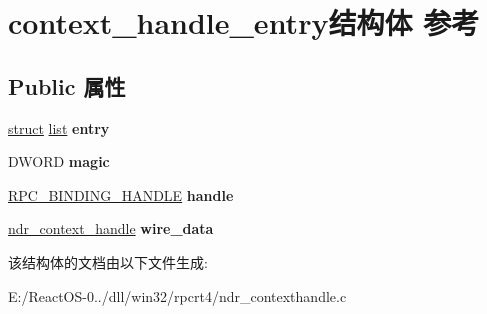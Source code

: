 \hypertarget{structcontext__handle__entry}{}\section{context\+\_\+handle\+\_\+entry结构体 参考}
\label{structcontext__handle__entry}
\subsection*{Public 属性}
\begin{DoxyCompactItemize}
\item 
\mbox{\label{structcontext__handle__entry_ac02e7e937f20ed9eef6688699f7652d3}} 
\hyperlink{interfacestruct}{struct} \hyperlink{classlist}{list} {\bfseries entry}
\item 
\mbox{\label{structcontext__handle__entry_ab9eb679bff4ba87871f0865f588b9299}} 
D\+W\+O\+RD {\bfseries magic}
\item 
\mbox{\label{structcontext__handle__entry_ada9b25fb96f83b4add779449413f6be7}} 
\hyperlink{interfacevoid}{R\+P\+C\+\_\+\+B\+I\+N\+D\+I\+N\+G\+\_\+\+H\+A\+N\+D\+LE} {\bfseries handle}
\item 
\mbox{\label{structcontext__handle__entry_a2e11f396238ef75e82d124626309e0c5}} 
\hyperlink{structndr__context__handle}{ndr\+\_\+context\+\_\+handle} {\bfseries wire\+\_\+data}
\end{DoxyCompactItemize}


该结构体的文档由以下文件生成\+:\begin{DoxyCompactItemize}
\item 
E\+:/\+React\+O\+S-\/0../dll/win32/rpcrt4/ndr\+\_\+contexthandle.\+c\end{DoxyCompactItemize}
